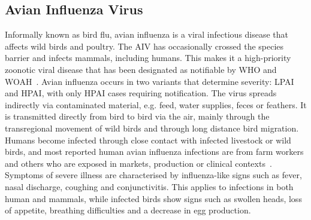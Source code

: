 \subsection{Avian Influenza Virus}
Informally known as bird flu, avian influenza is a viral infectious disease that affects wild birds and poultry. The \ac{AIV} has occasionally crossed the species barrier and infects mammals, including humans. This makes it a high-priority zoonotic viral disease that has been designated as notifiable by \ac{WHO} and \ac{WOAH}~\cite{woah2023list}. Avian influenza occurs in two variants that determine severity: \ac{LPAI} and \ac{HPAI}, with only \ac{HPAI} cases requiring notification. The virus spreads indirectly via contaminated material, e.g. feed, water supplies, feces or feathers. It is transmitted directly from bird to bird via the air, mainly through the transregional movement of wild birds and through long distance bird migration. Humans become infected through close contact with infected livestock or wild birds, and most reported human avian influenza infections are from farm workers and others who are exposed in markets, production or clinical contexts~\cite{webster1992evolution}. \\
Symptoms of severe illness are characterised by influenza-like signs such as fever, nasal discharge, coughing and conjunctivitis. This applies to infections in both human and mammals, while infected birds show signs such as swollen heads, loss of appetite, breathing difficulties and a decrease in egg production.

